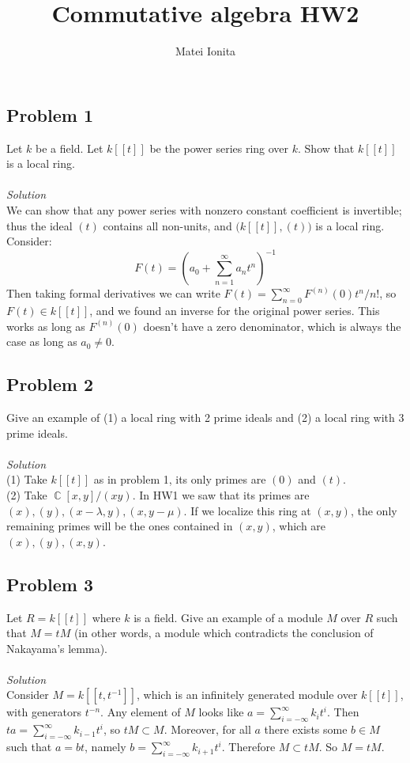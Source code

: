 \documentclass[12 pt]{article}
\title{Commutative algebra HW2}
\author{Matei Ionita}
\DeclareMathOperator {\C} {\mathbb{C}}
\begin{document}
  \maketitle

\subsection*{Problem 1}
Let $k$ be a field. Let $k[[t]]$ be the power series ring over $k$. Show that $k[[t]]$ is a local ring.
\\
\\
\emph{Solution}
\\
We can show that any power series with nonzero constant coefficient is invertible; thus the ideal $(t)$ contains all non-units, and $\big(k[[t]], (t)\big)$ is a local ring. Consider:
\[    F(t) = \left( a_0 + \sum_{n=1}^{\infty} a_n t^n  \right)^{-1}       \]
Then taking formal derivatives we can write $F(t) = \sum_{n=0}^{\infty} F^{(n)}(0) t^n / n!$, so $F(t) \in k[[t]]$, and we found an inverse for the original power series. This works as long as $F^{(n)} (0)$ doesn't have a zero denominator, which is always the case as long as $a_0 \neq 0$.

\subsection*{Problem 2}
Give an example of (1) a local ring with 2 prime ideals and (2) a local ring with 3 prime ideals.
\\
\\
\emph{Solution}
\\
(1) Take $k[[t]]$ as in problem 1, its only primes are $(0)$ and $(t)$.
\\
(2) Take $\C[x,y]/(xy)$. In HW1 we saw that its primes are $(x), (y), (x-\lambda, y), (x, y-\mu)$. If we localize this ring at $(x,y)$, the only remaining primes will be the ones contained in $(x,y)$, which are $(x), (y), (x,y)$.

\subsection*{Problem 3}
Let $R = k[[t]]$ where $k$ is a field. Give an example of a module $M$ over $R$ such that $M = tM$ (in other words, a module which contradicts the conclusion of Nakayama's lemma).
\\
\\
\emph{Solution}
\\
Consider $M = k[[t, t^{-1}]]$, which is an infinitely generated module over $k[[t]]$, with generators $t^{-n}$. Any element of $M$ looks like $a = \sum_{i=-\infty}^{\infty} k_i t^i$. Then $ta = \sum_{i=-\infty}^{\infty} k_{i-1} t^i$, so $tM\subset M$. Moreover, for all $a$ there exists some $b\in M$ such that $a = bt$, namely $b = \sum_{i=-\infty}^{\infty} k_{i+1} t^i$. Therefore $M\subset tM$. So $M = tM$.
\end{document}
